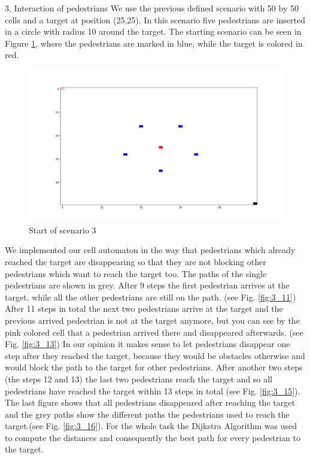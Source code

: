 \documentclass[10pt,a4paper]{article}
\begin{document}
\begin{task}{3, Interaction of pedestrians}
We use the previous defined scenario with 50 by 50 cells and a target at position (25,25). In this scenario five pedestrians are inserted in a circle with radius 10 around the target. The starting scenario can be seen in Figure \ref{fig:start_3}, where the pedestrians are marked in blue, while the target is colored in red.
\begin{figure}[h!]
    \centering
    \includegraphics[width=\textwidth]{pictures/Figure_2.png}
    \caption{Start of scenario 3}
    \label{fig:start_3}
\end{figure}
We implemented our cell automaton in the way that pedestrians which already reached the target are disappearing so that they are not blocking other pedestrians which want to reach the target too. The paths of the single pedestrians are shown in grey. After 9 steps the first pedestrian arrives at the target, while all the other pedestrians are still on the path. (see Fig. \ref{fig:3_11}) After 11 steps in total the next two pedestrians arrive at the target and the previous arrived pedestrian is not at the target anymore, but you can see by the pink colored cell that a pedestrian arrived there and disappeared afterwards. (see Fig. \ref{fig:3_13}) In our opinion it makes sense to let pedestrians disappear one step after they reached the target, because they would be obstacles otherwise and would block the path to the target for other pedestrians. After another two steps (the steps 12 and 13) the last two pedestrians reach the target and so all pedestrians have reached the target within 13 steps in total (see Fig. \ref{fig:3_15}). The last figure shows that all pedestrians disappeared after reaching the target and the grey paths show the different paths the pedestrians used to reach the target.(see Fig. \ref{fig:3_16}). For the whole task the Dijkstra Algorithm was used to compute the distances and consequently the best path for every pedestrian to the target.

\end{task}
\end{document}
